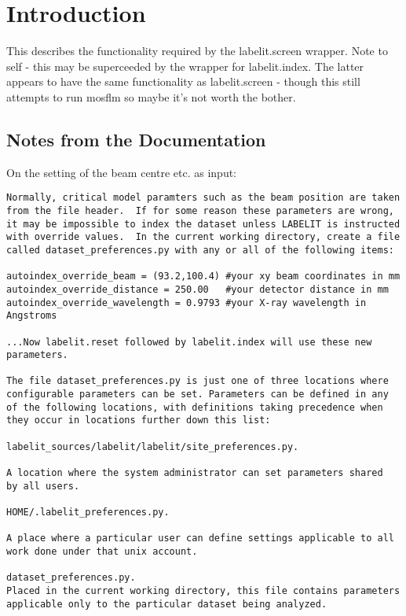 \documentclass[a4paper, 11pt]{article}
\begin{document}
\section{Introduction}

This describes the functionality required by the labelit.screen wrapper.
Note to self - this may be superceeded by the wrapper for labelit.index.
The latter appears to have the same functionality as labelit.screen - though
this still attempts to run mosflm so maybe it's not worth the bother.

\subsection{Notes from the Documentation}

On the setting of the beam centre etc. as input:

{
\tiny
\begin{verbatim}
Normally, critical model paramters such as the beam position are taken 
from the file header.  If for some reason these parameters are wrong, 
it may be impossible to index the dataset unless LABELIT is instructed 
with override values.  In the current working directory, create a file 
called dataset_preferences.py with any or all of the following items:

autoindex_override_beam = (93.2,100.4) #your xy beam coordinates in mm
autoindex_override_distance = 250.00   #your detector distance in mm
autoindex_override_wavelength = 0.9793 #your X-ray wavelength in Angstroms

...Now labelit.reset followed by labelit.index will use these new parameters.

The file dataset_preferences.py is just one of three locations where 
configurable parameters can be set. Parameters can be defined in any 
of the following locations, with definitions taking precedence when 
they occur in locations further down this list: 

labelit_sources/labelit/labelit/site_preferences.py. 

A location where the system administrator can set parameters shared 
by all users. 

HOME/.labelit_preferences.py. 

A place where a particular user can define settings applicable to all 
work done under that unix account. 

dataset_preferences.py. 
Placed in the current working directory, this file contains parameters 
applicable only to the particular dataset being analyzed. 
\end{verbatim}
}
\end{document}
